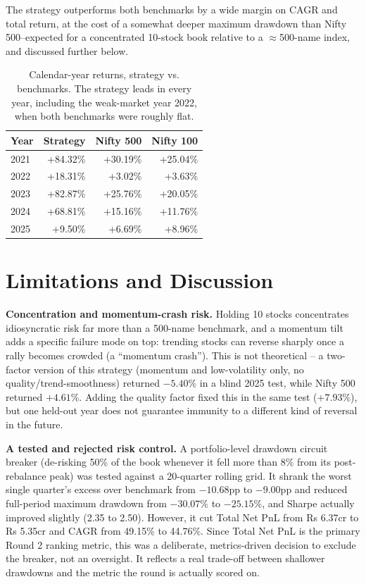 \documentclass[11pt]{article}
\begin{document}
The strategy outperforms both benchmarks by a wide margin on CAGR and total return, at the cost of a somewhat deeper maximum drawdown than Nifty 500--expected for a concentrated 10-stock book relative to a $\approx$500-name index, and discussed further below.

\begin{table}[h]
\centering
\begin{tabular}{lrrr}
\toprule
\textbf{Year} & \textbf{Strategy} & \textbf{Nifty 500} & \textbf{Nifty 100} \\
\midrule
2021 & +84.32\% & +30.19\% & +25.04\% \\
2022 & +18.31\% & +3.02\% & +3.63\% \\
2023 & +82.87\% & +25.76\% & +20.05\% \\
2024 & +68.81\% & +15.16\% & +11.76\% \\
2025 & +9.50\% & +6.69\% & +8.96\% \\
\bottomrule
\end{tabular}
\caption{Calendar-year returns, strategy vs. benchmarks. The strategy leads in every year, including the weak-market year 2022, when both benchmarks were roughly flat.}
\end{table}

\section{Limitations and Discussion}

\textbf{Concentration and momentum-crash risk.} Holding 10 stocks concentrates idiosyncratic risk far more than a 500-name benchmark, and a momentum tilt adds a specific failure mode on top: trending stocks can reverse sharply once a rally becomes crowded (a ``momentum crash''). This is not theoretical -- a two-factor version of this strategy (momentum and low-volatility only, no quality/trend-smoothness) returned $-5.40\%$ in a blind 2025 test, while Nifty 500 returned $+4.61\%$. Adding the quality factor fixed this in the same test ($+7.93\%$), but one held-out year does not guarantee immunity to a different kind of reversal in the future.

\textbf{A tested and rejected risk control.} A portfolio-level drawdown circuit breaker (de-risking 50\% of the book whenever it fell more than 8\% from its post-rebalance peak) was tested against a 20-quarter rolling grid. It shrank the worst single quarter's excess over benchmark from $-10.68$pp to $-9.00$pp and reduced full-period maximum drawdown from $-30.07\%$ to $-25.15\%$, and Sharpe actually improved slightly (2.35 to 2.50). However, it cut Total Net PnL from Rs 6.37cr to Rs 5.35cr and CAGR from 49.15\% to 44.76\%. Since Total Net PnL is the primary Round 2 ranking metric, this was a deliberate, metrics-driven decision to exclude the breaker, not an oversight. It reflects a real trade-off between shallower drawdowns and the metric the round is actually scored on.
\end{document}
